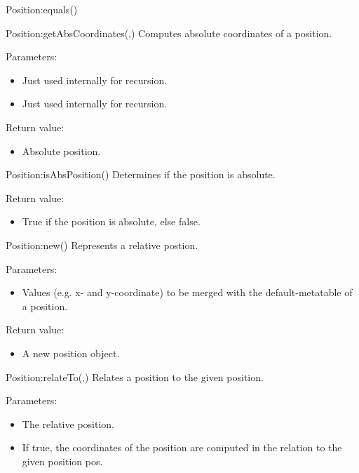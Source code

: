 \begin{luacommand}{{Position:equals}()}
\end{luacommand}\begin{luacommand}{{Position:getAbsCoordinates}(,)}
Computes absolute coordinates of a position.

Parameters:
\begin{itemize}
	\item[]  \subitem Just used internally for recursion.
	\item[]  \subitem Just used internally for recursion.
\end{itemize}


Return value:
\begin{itemize} \item[] Absolute position. \end{itemize}


\end{luacommand}\begin{luacommand}{{Position:isAbsPosition}()}
Determines if the position is absolute.


Return value:
\begin{itemize} \item[] True if the position is absolute, else false. \end{itemize}


\end{luacommand}\begin{luacommand}{{Position:new}()}
Represents a relative postion.

Parameters:
\begin{itemize}
	\item[]  \subitem Values (e.g. x- and y-coordinate) to be merged with the default-metatable of a position.
\end{itemize}


Return value:
\begin{itemize} \item[] A new position object. \end{itemize}


\end{luacommand}\begin{luacommand}{{Position:relateTo}(,)}
Relates a position to the given position.

Parameters:
\begin{itemize}
	\item[]  \subitem The relative position.\item[]  \subitem If true, the coordinates of the position are computed in the relation to the given position pos.
\end{itemize}



\end{luacommand}
